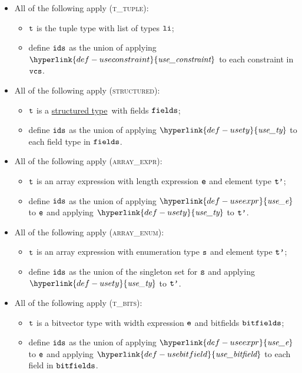 \documentclass{book}
\newcommand\usety[0]{\hyperlink{def-usety}{\textfunc{use\_ty}}}
\newcommand\useexpr[0]{\hyperlink{def-useexpr}{\textfunc{use\_e}}}
\newcommand\usebitfield[0]{\hyperlink{def-usebitfield}{\textfunc{use\_bitfield}}}
\newcommand\useconstraint[0]{\hyperlink{def-useconstraint}{\textfunc{use\_constraint}}}
\newcommand\structuredtype[0]{\hyperlink{def-structuredtype}{structured type}}
\begin{document}
\begin{itemize}
  \item All of the following apply (\textsc{t\_tuple}):
  \begin{itemize}
    \item $\texttt{t}$ is the tuple type with list of types $\texttt{li}$;
    \item define $\texttt{ids}$ as the union of applying $\useconstraint$ to each constraint in $\texttt{vcs}$.
  \end{itemize}

  \item All of the following apply (\textsc{structured}):
  \begin{itemize}
    \item $\texttt{t}$ is a \structuredtype\ with fields $\texttt{fields}$;
    \item define $\texttt{ids}$ as the union of applying $\usety$ to each field type in $\texttt{fields}$.
  \end{itemize}

  \item All of the following apply (\textsc{array\_expr}):
  \begin{itemize}
    \item $\texttt{t}$ is an array expression with length expression $\texttt{e}$ and element type $\texttt{t'}$;
    \item define $\texttt{ids}$ as the union of applying $\useexpr$ to $\texttt{e}$ and applying $\usety$ to $\texttt{t'}$.
  \end{itemize}

  \item All of the following apply (\textsc{array\_enum}):
  \begin{itemize}
    \item $\texttt{t}$ is an array expression with enumeration type $\texttt{s}$ and element type $\texttt{t'}$;
    \item define $\texttt{ids}$ as the union of the singleton set for $\texttt{s}$ and applying $\usety$ to $\texttt{t'}$.
  \end{itemize}

  \item All of the following apply (\textsc{t\_bits}):
  \begin{itemize}
    \item $\texttt{t}$ is a bitvector type with width expression $\texttt{e}$ and bitfields $\texttt{bitfields}$;
    \item define $\texttt{ids}$ as the union of applying $\useexpr$ to $\texttt{e}$ and applying $\usebitfield$ to each field in $\texttt{bitfields}$.
  \end{itemize}
\end{itemize}
\end{document}
